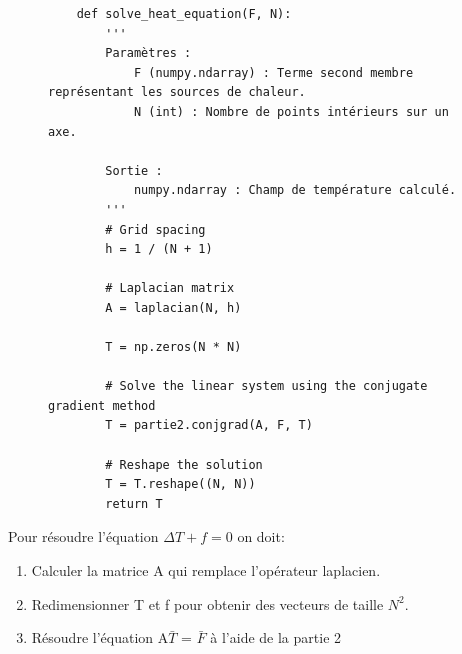 \documentclass{article}
\begin{document}
\begin{figure}[h]
    \centering
    \begin{verbatim}
    def solve_heat_equation(F, N):
        '''
        Paramètres :
            F (numpy.ndarray) : Terme second membre représentant les sources de chaleur.
            N (int) : Nombre de points intérieurs sur un axe.
        
        Sortie :
            numpy.ndarray : Champ de température calculé.
        '''
        # Grid spacing
        h = 1 / (N + 1)

        # Laplacian matrix
        A = laplacian(N, h)

        T = np.zeros(N * N)

        # Solve the linear system using the conjugate gradient method
        T = partie2.conjgrad(A, F, T)

        # Reshape the solution
        T = T.reshape((N, N))
        return T
    \end{verbatim}
    \label{fig:eqChaleur}
\end{figure}

Pour résoudre l'équation $\Delta T + f = 0$ on doit:

\begin{enumerate}
    \item Calculer la matrice A qui remplace l'opérateur laplacien.
    \item Redimensionner T et f pour obtenir des vecteurs de taille $N^2$.
    \item Résoudre l'équation A$\bar{T}$ = $\bar{F}$ à l'aide de la partie 2
\end{enumerate}
\end{document}
